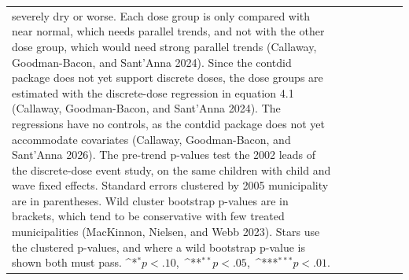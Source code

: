 \documentclass[12pt]{article}
\def\sym#1{\ifmmode^{#1}\else\(^{#1}\)\fi}
\begin{document}
\begin{longtable}{l*{6}{c}}
{severely dry or worse. Each dose group is only compared with near normal, which needs parallel trends, and not with the other dose group, which would need strong parallel trends (Callaway, Goodman-Bacon, and Sant'Anna 2024). Since the contdid package does not yet support discrete doses, the dose groups are estimated with the discrete-dose regression in equation 4.1 (Callaway, Goodman-Bacon, and Sant'Anna 2024). The regressions have no controls, as the contdid package does not yet accommodate covariates (Callaway, Goodman-Bacon, and Sant'Anna 2026). The pre-trend p-values test the 2002 leads of the discrete-dose event study, on the same children with child and wave fixed effects. Standard errors clustered by 2005 municipality are in parentheses.
Wild cluster bootstrap p-values are in brackets, which tend to be conservative with few treated municipalities (MacKinnon, Nielsen, and Webb 2023). Stars use the clustered p-values, and where a wild bootstrap p-value is shown both must pass. \mbox{\sym{*}\(p<.10\), \sym{**}\(p<.05\), \sym{***}\(p<.01\).}}\\
\end{longtable}
\endgroup
\clearpage
\begingroup
\footnotesize
\renewcommand{\arraystretch}{0.86}
\setlength{\tabcolsep}{4pt}
\setlength{\LTcapwidth}{\textwidth}
\end{document}
